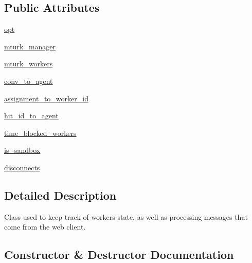 \subsection*{Public Attributes}
\begin{DoxyCompactItemize}
\item 
\hyperlink{classparlai_1_1mturk_1_1core_1_1worker__manager_1_1WorkerManager_a69b6fcf739bcdaf914fe524772738309}{opt}
\item 
\hyperlink{classparlai_1_1mturk_1_1core_1_1worker__manager_1_1WorkerManager_a90e4c41010915289fa5e8e1fb0572623}{mturk\+\_\+manager}
\item 
\hyperlink{classparlai_1_1mturk_1_1core_1_1worker__manager_1_1WorkerManager_a52976ae5dca085ae8398305c36e781b9}{mturk\+\_\+workers}
\item 
\hyperlink{classparlai_1_1mturk_1_1core_1_1worker__manager_1_1WorkerManager_a878a7bb6afd1530ecc8cc8852a8990a6}{conv\+\_\+to\+\_\+agent}
\item 
\hyperlink{classparlai_1_1mturk_1_1core_1_1worker__manager_1_1WorkerManager_ad3bec2328ee19706027d1279e5910a22}{assignment\+\_\+to\+\_\+worker\+\_\+id}
\item 
\hyperlink{classparlai_1_1mturk_1_1core_1_1worker__manager_1_1WorkerManager_abff39f43090e885a3c8b74f4fcc06d55}{hit\+\_\+id\+\_\+to\+\_\+agent}
\item 
\hyperlink{classparlai_1_1mturk_1_1core_1_1worker__manager_1_1WorkerManager_aa51476aab479eae8096ae6097a8571f8}{time\+\_\+blocked\+\_\+workers}
\item 
\hyperlink{classparlai_1_1mturk_1_1core_1_1worker__manager_1_1WorkerManager_abd069a274bd03b3aeab20c3f788cf127}{is\+\_\+sandbox}
\item 
\hyperlink{classparlai_1_1mturk_1_1core_1_1worker__manager_1_1WorkerManager_a1fcba62024d92a25d76e0f106d76fd81}{disconnects}
\end{DoxyCompactItemize}


\subsection{Detailed Description}
\begin{DoxyVerb}Class used to keep track of workers state, as well as processing messages that come
from the web client.
\end{DoxyVerb}
 

\subsection{Constructor \& Destructor Documentation}
\mbox{\label{classparlai_1_1mturk_1_1core_1_1worker__manager_1_1WorkerManager_a3cb56395af2a5c89c048ee3f9b5b8f7a}} 
